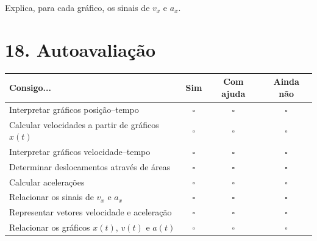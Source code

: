 \documentclass[11pt,a4paper]{article}
\newcommand{\resposta}[1][0.8]{
	\vspace{#1cm}
}
\begin{document}
	\resposta[1.2]
	
	Explica, para cada gráfico, os sinais de $v_x$ e $a_x$.
	
	\resposta[1.5]
	
	\section{18. Autoavaliação}
	
	\begin{center}
		
		\renewcommand{\arraystretch}{1.45}
		
		\begin{tabularx}{\textwidth}{Xccc}
			
			\toprule
			
			\textbf{Consigo...}
			&
			\textbf{Sim}
			&
			\textbf{Com ajuda}
			&
			\textbf{Ainda não}
			
			\\
			
			\midrule
			
			Interpretar gráficos posição--tempo
			&
			$\square$
			&
			$\square$
			&
			$\square$
			\\
			
			Calcular velocidades a partir de gráficos $x(t)$
			&
			$\square$
			&
			$\square$
			&
			$\square$
			\\
			
			Interpretar gráficos velocidade--tempo
			&
			$\square$
			&
			$\square$
			&
			$\square$
			\\
			
			Determinar deslocamentos através de áreas
			&
			$\square$
			&
			$\square$
			&
			$\square$
			\\
			
			Calcular acelerações
			&
			$\square$
			&
			$\square$
			&
			$\square$
			\\
			
			Relacionar os sinais de $v_x$ e $a_x$
			&
			$\square$
			&
			$\square$
			&
			$\square$
			\\
			
			Representar vetores velocidade e aceleração
			&
			$\square$
			&
			$\square$
			&
			$\square$
			\\
			
			Relacionar os gráficos $x(t)$, $v(t)$ e $a(t)$
			&
			$\square$
			&
			$\square$
			&
			$\square$
			\\
			
			\bottomrule
			
		\end{tabularx}
		
	\end{center}
	
\end{document}
